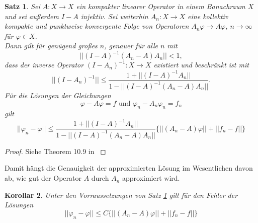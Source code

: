 \documentclass[12pt,a4paper]{scrartcl}
\newtheorem{Satz}{Satz}[section]
\newtheorem{Kor}[Satz]{Korollar}
\numberwithin{equation}{section}
\begin{document}
\begin{Satz} \label{ErrSatz}
Sei $A:X\to X$ ein kompakter linearer Operator in einem Banachraum $X$ und sei außerdem $I - A$ injektiv. Sei weiterhin $A_n : X \to X$ eine kollektiv kompakte und punktweise konvergente Folge von Operatoren $A_n \varphi \to A \varphi$, $n \to \infty$ für $\varphi \in X$. \\
Dann gilt für genügend großes $n$, genauer für alle $n$ mit
\[
  ||(I-A)^{-1}(A_n-A)A_n|| < 1,
\]   
dass der inverse Operator $(I-A_n)^{-1}:X \to X$ existiert und beschränkt ist mit
\begin{equation}
||(I-A_n)^{-1}||\leq \frac{1+||(I-A)^{-1}A_n||}{1-||(I-A)^{-1}(A_n-A)A_n||}.
\end{equation}
Für die Lösungen der Gleichungen 
\[
  \varphi - A\varphi =f \text{ und }\varphi_n-A_n\varphi_n=f_n
\]
gilt
\[
  ||\varphi_n-\varphi||\leq \frac{1+||(I-A)^{-1} A_n||}{1-||(I-A)^{-1}(A_n-A)A_n||}\{||(A_n-A)\varphi||+||f_n-f||\}
\]
\end{Satz}
\begin{proof}
Siehe Theorem 10.9 in \cite{kress}
\end{proof}
Damit hängt die Genauigkeit der approximierten Lösung im Wesentlichen davon ab, wie gut der Operator $A$ durch $A_n$ approximiert wird.
\begin{Kor} \label{ErrSatz2}
Unter den Vorraussetzungen von Satz \ref{ErrSatz} gilt für den Fehler der Lösungen
\begin{equation}
|| \varphi_n - \varphi || \leq C \{||(A_n -A) \varphi||+||f_n-f||\}
\end{equation}
\end{Kor}
  
\end{document}
